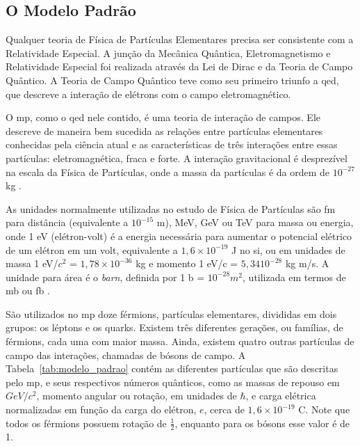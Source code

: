 \subsection{O Modelo Padrão}
\label{ssec:mp}

Qualquer teoria de Física de Partículas Elementares precisa ser consistente com
a Relatividade Especial. A junção da Mecânica Quântica, Eletromagnetismo e
Relatividade Especial foi realizada através da Lei de Dirac e da Teoria de
Campo Quântico. A Teoria de Campo Quântico teve como seu primeiro triunfo a
\gls{qed}, que descreve a interação de elétrons com o campo
eletromagnético. 

O \gls{mp}, como o \gls{qed} nele contido, é uma teoria de
interação de campos. Ele descreve de maneira 
bem sucedida as relações entre
partículas elementares conhecidas pela ciência atual 
\cite{Intro_Nuclear} e as características de
três interações entre essas partículas:
eletromagnética, fraca e forte. A interação gravitacional é
desprezível na escala da Física de Partículas, onde a massa da partículas é da
ordem de $10^{-27}$ kg \cite{Intro_Standard}.

As unidades normalmente utilizadas no estudo de Física de Partículas são fm para
distância (equivalente a $10^{-15}$ m), MeV, GeV ou TeV para massa ou energia, onde 1
eV (elétron-volt) é a energia necessária para aumentar o potencial elétrico de
um elétron em um volt, equivalente a $1,6\times10^{-19}$ J no \gls{si}, ou em unidades
de massa 1 eV/$c^2$ = $1,78\times10^{-36}$ kg e momento 1 eV/c = $5,34 10^{-28}$ kg m/s. 
A unidade para área é o \emph{barn}, definida por 1 b = $10^{-28} m^2$, utilizada em
termos de mb ou fb \cite{Intro_Nuclear}.

São utilizados no \gls{mp} doze férmions, partículas elementares, divididas em dois grupos: os
léptons e os quarks. Existem três diferentes gerações, ou famílias, de férmions, cada uma com maior
massa. Ainda, existem quatro outras partículas de campo das
interações, chamadas de bósons de campo.
A Tabela~\ref{tab:modelo_padrao} contém as diferentes partículas que são
descritas pelo \gls{mp}, e seus respectivos números quânticos, como as massas de repouso em $GeV/c^2$, momento
angular ou rotação, em unidades de $\hbar$, e carga elétrica normalizadas em função da carga
do elétron, $e$, cerca de $1,6\times10^{-19}$ C. Note que todos os férmions
possuem rotação de $\frac{1}{2}$, enquanto para os bósons esse valor é de 1.

